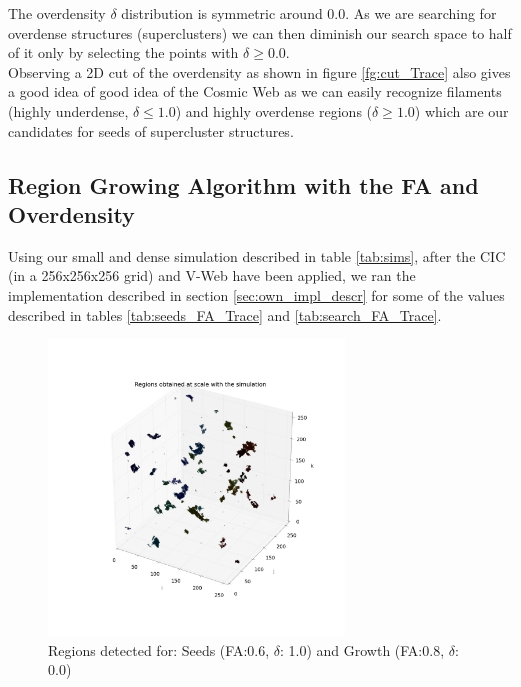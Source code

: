 \documentclass[12pt]{article}
\begin{document}
\begin{par}
The overdensity $\delta$ distribution is symmetric
 around 0.0. As we are searching for overdense
  structures (superclusters) we can then diminish
   our search space to half of it only by
    selecting the points with $\delta \geq 0.0$. \\
Observing a 2D cut of the overdensity as shown in
 figure \ref{fg:cut_Trace} also gives a good idea
  of good idea of the Cosmic Web as we can easily
   recognize filaments (highly underdense, $\delta
    \leq 1.0$) and highly overdense regions
     ($\delta \geq 1.0$) which are our candidates
      for seeds of supercluster structures.
\end{par}



\subsection{Region Growing Algorithm with the FA and Overdensity} \label{sec:results_own_impl}
\begin{par}
Using our small and dense simulation described in
 table \ref{tab:sims}, after the CIC (in a
  256x256x256 grid) and V-Web have been applied,
   we ran the implementation described in section
    \ref{sec:own_impl_descr} for some of the
     values described in tables
      \ref{tab:seeds_FA_Trace} and
       \ref{tab:search_FA_Trace}. 
\end{par}

\begin{figure}[ht]
\begin{center}
\includegraphics[width=0.7\textwidth]{groups/firstimplementation/regions_3D_129.png} %
\caption{Regions detected for: Seeds (FA:0.6, $\delta$: 1.0) and Growth (FA:0.8, $\delta$: 0.0) }
\label{fg:first_3D_all}
\end{center}
\end{figure}
\FloatBarrier
\end{document}
